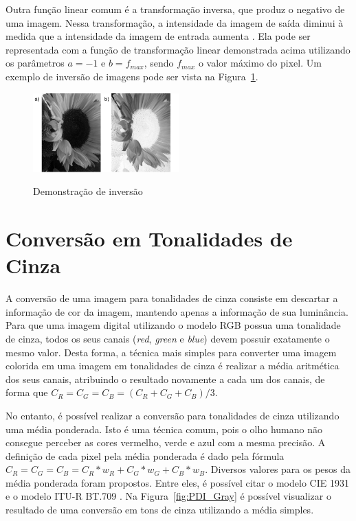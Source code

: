 \documentclass[12pt,oneside,a4paper,english,french,spanish,brazil,]{abntex2}
\begin{document}
Outra função linear comum é a transformação inversa, que produz o negativo de uma imagem. Nessa transformação, a intensidade da imagem de saída diminui à medida que a intensidade da imagem de entrada aumenta \cite{pedrini:2008}. Ela pode ser representada com a função de transformação linear demonstrada acima utilizando os parâmetros \(a=-1\) e \(b=f_{max}\), sendo \(f_{max}\) o valor máximo do pixel. Um exemplo de inversão de imagens pode ser vista na Figura~\ref{fig:PDI_Inversao}.

\begin{figure}[ht]
\centering
\caption{Demonstração de inversão}
\includegraphics[width=0.5\textwidth]{imagens/PDI_Inversao.pdf}
\sourceAuthor
\label{fig:PDI_Inversao}
\end{figure}

\section{Conversão em Tonalidades de Cinza}

A conversão de uma imagem para tonalidades de cinza consiste em descartar a informação de cor da imagem, mantendo apenas a informação de sua luminância. Para que uma imagem digital utilizando o modelo RGB possua uma tonalidade de cinza, todos os seus canais (\textit{red}, \textit{green} e \textit{blue}) devem possuir exatamente o mesmo valor. Desta forma, a técnica mais simples para converter uma imagem colorida em uma imagem em tonalidades de cinza é realizar a média aritmética dos seus canais, atribuindo o resultado novamente a cada um dos canais, de forma que \(C_R = C_G = C_B = (C_R + C_G + C_B) / 3\).

No entanto, é possível realizar a conversão para tonalidades de cinza utilizando uma média ponderada. Isto é uma técnica comum, pois o olho humano não consegue perceber as cores vermelho, verde e azul com a mesma precisão. A definição de cada pixel pela média ponderada é dado pela fórmula \(C_R = C_G = C_B = C_R * w_R + C_G * w_G + C_B * w_B\). Diversos valores para os pesos da média ponderada foram propostos. Entre eles, é possível citar o modelo CIE 1931 \cite{broadbent:2004} e o modelo ITU-R BT.709 \cite{anderson:1996}. Na Figura~\ref{fig:PDI_Gray} é possível visualizar o resultado de uma conversão em tons de cinza utilizando a média simples.
\end{document}

